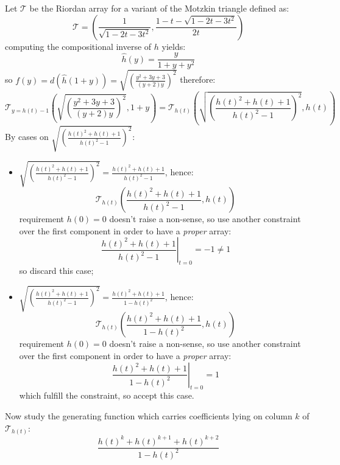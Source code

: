 \documentclass[11pt,a4paper]{article} %
\begin{document}
    Let $\mathcal{T}$ be the Riordan array for a variant of the Motzkin triangle defined as:
    \begin{displaymath} 
        \mathcal{T} = \left(\frac{1}{\sqrt{1-2t-3t^2}}, 
           \frac{1-t-\sqrt{1-2t-3t^2}}{2t}  \right)
    \end{displaymath} 
    computing the compositional inverse of $h$ yields:
    \begin{displaymath} 
        \hat{h}(y) = \frac{y}{1+y+y^2}
    \end{displaymath} 
    so $f(y)=d(\hat{h}(1+y))=\sqrt{\left(\frac{y^2+3y+3}{(y+2)y}\right)^{2}}$ therefore:
    \begin{displaymath} 
        \mathcal{T}_{y=h(t)-1}\left( \sqrt{\left(\frac{y^2+3y+3}{(y+2)y}\right)^{2}}, 1+y \right) = 
            \mathcal{T}_{h(t)}\left( \sqrt{\left(\frac{h(t)^2+h(t)+1}{h(t)^2-1}\right)^{2}}, h(t) \right) 
    \end{displaymath} 
    By cases on $\sqrt{\left(\frac{h(t)^2+h(t)+1}{h(t)^2-1}\right)^{2}}$:
    \begin{itemize}
        \item $\sqrt{\left(\frac{h(t)^2+h(t)+1}{h(t)^2-1}\right)^{2}}=\frac{h(t)^2+h(t)+1}{h(t)^2-1}$, hence:
            \begin{displaymath} 
                \mathcal{T}_{h(t)}\left(\frac{h(t)^2+h(t)+1}{h(t)^2-1}, h(t) \right)
            \end{displaymath} 
            requirement $h(0)=0$ doesn't raise a non-sense, so use another 
            constraint over the first component in order to have a 
            \emph{proper} array:
            \begin{displaymath}
                \left. \frac{h(t)^2+h(t)+1}{h(t)^2-1} \right|_{t=0} = -1 \not= 1 
            \end{displaymath} 
            so discard this case;
        \item $\sqrt{\left(\frac{h(t)^2+h(t)+1}{h(t)^2-1}\right)^{2}}=\frac{h(t)^2+h(t)+1}{1-h(t)^2}$, hence:
            \begin{displaymath}
                \mathcal{T}_{h(t)}\left(\frac{h(t)^2+h(t)+1}{1-h(t)^2}, h(t) \right)
            \end{displaymath} 
            requirement $h(0)=0$ doesn't raise a non-sense, so use another 
            constraint over the first component in order to have a 
            \emph{proper} array:
            \begin{displaymath}
                \left. \frac{h(t)^2+h(t)+1}{1-h(t)^2} \right|_{t=0} = 1 
            \end{displaymath} 
            which fulfill the constraint, so accept this case.
    \end{itemize}
    Now study the generating function which carries coefficients lying on column $k$
    of $\mathcal{T}_{h(t)}$:
    \begin{displaymath} 
        \frac{h(t)^{k}+h(t)^{k+1}+h(t)^{k+2}}{1-h(t)^2 }
    \end{displaymath} 
\end{document}
